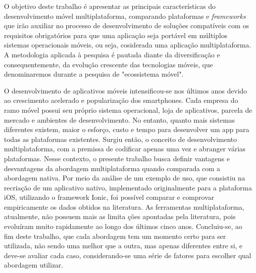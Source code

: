 O objetivo deste trabalho é apresentar as principais características do desenvolvimento móvel multiplataforma, comparando plataformas e \textit{frameworks} que irão auxiliar no processo de desenvolvimento de soluções compatíveis com os requisitos obrigatórios para que uma aplicação seja
portável em múltiplos sistemas operacionais móveis, ou seja, cosiderada uma aplicação multiplataforma. A metodologia aplicada à pesquisa é pautada diante da diversificação e consequentemente, da evolução crescente das tecnologias móveis, que denominaremos durante a pesquisa de "ecossistema móvel". 


O desenvolvimento de aplicativos móveis intensificou-se nos últimos anos devido ao crescimento acelerado e popularização dos smartphones. Cada empresa do ramo móvel possui seu próprio sistema operacional, loja de aplicativos, parcela de mercado e ambientes de desenvolvimento. No entanto, quanto mais sistemas diferentes existem, maior o esforço, custo e tempo para desenvolver um app para todas as plataformas existentes. Surgiu então, o conceito de desenvolvimento multiplataforma, com a premissa de codificar apenas uma vez e abranger várias plataformas. Nesse contexto, o presente trabalho busca definir vantagens e desvantagens da abordagem multiplataforma quando comparada com a abordagem nativa. Por meio da análise de um exemplo de uso, que consistiu na recriação de um aplicativo nativo, implementado originalmente para a plataforma iOS, utilizando o framework Ionic, foi possível comparar e comprovar empiricamente os dados obtidos na literatura. As ferramentas multiplataforma, atualmente, não possuem mais as limita ções apontadas pela literatura, pois evoluíram muito rapidamente ao longo dos últimos cinco anos. Concluiu-se, ao fim deste trabalho, que cada abordagem tem um momento certo para ser utilizada, não sendo uma melhor que a outra, mas apenas diferentes entre si, e deve-se avaliar cada caso, considerando-se uma série de fatores para escolher qual abordagem utilizar.

